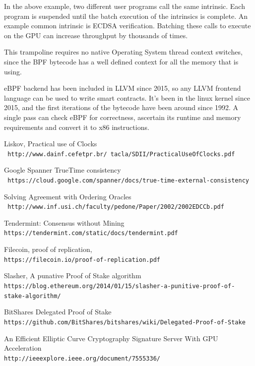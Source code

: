 \documentclass[12pt]{article}
\begin{document}
In the above example, two different user programs call the same intrinsic.  Each program is suspended until the batch execution of the intrinsics is complete.  An example common intrinsic is ECDSA verification.  Batching these calls to execute on the GPU can increase throughput by thousands of times.

This trampoline requires no native Operating System thread context switches, since the BPF bytecode has a well defined context for all the memory that is using.

eBPF backend has been included in LLVM since 2015, so any LLVM frontend language can be used to write smart contracts.  It’s been in the linux kernel since 2015, and the first iterations of the bytecode have been around since 1992.  A single pass can check eBPF for correctness, ascertain its runtime and memory requirements and convert it to x86 instructions.




\begin{thebibliography}{9}
Liskov, Practical use of Clocks
\\\texttt{ http://www.dainf.cefetpr.br/~tacla/SDII/PracticalUseOfClocks.pdf}

Google Spanner TrueTime consistency
\\\texttt{ https://cloud.google.com/spanner/docs/true-time-external-consistency}

Solving Agreement with Ordering Oracles
\\\texttt{ http://www.inf.usi.ch/faculty/pedone/Paper/2002/2002EDCCb.pdf}

Tendermint: Consensus without Mining
\\\texttt{https://tendermint.com/static/docs/tendermint.pdf}

Filecoin, proof of replication,
\\\texttt{https://filecoin.io/proof-of-replication.pdf}

Slasher, A punative Proof of Stake algorithm
\\\texttt{https://blog.ethereum.org/2014/01/15/slasher-a-punitive-proof-of-stake-algorithm/}

BitShares Delegated Proof of Stake
\\\texttt{https://github.com/BitShares/bitshares/wiki/Delegated-Proof-of-Stake}

An Efficient Elliptic Curve Cryptography Signature Server With GPU Acceleration
\\\texttt{http://ieeexplore.ieee.org/document/7555336/}
\end{thebibliography}
\end{document}
